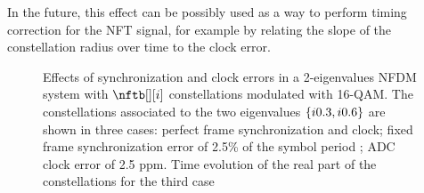 \begin{extendedthesis}
In the future, this effect can be possibly used as a way to perform timing correction for the \ac{NFT} signal, for example by relating the slope of the constellation radius over time to the clock error.
\end{extendedthesis}

\begin{figure}[tb]
  \raggedright

  \caption{Effects of synchronization and clock errors in a 2-eigenvalues \ac{NFDM}
           system with $\nftb[][i]$ constellations modulated with 16-\ac{QAM}.
           The constellations associated to the two eigenvalues $\{i0.3,i0.6\}$ are shown in three cases:
             perfect frame synchronization and clock;
            fixed frame synchronization error of 2.5\% of the symbol period \Ts;
            \ac{ADC} clock error of 2.5 \ac{ppm}.
            Time evolution of the real part of the constellations for the third case}
  \label{fig:constellation_shrinked_and_clock_error}
\end{figure}




